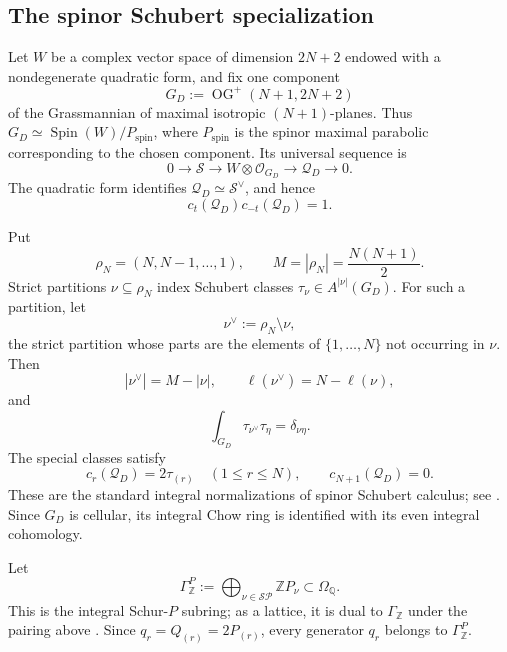 \documentclass[11pt,a4paper,oneside]{amsart}
\numberwithin{equation}{section}
\theoremstyle{definition}
\theoremstyle{remark}
\begin{document}
\subsection{The spinor Schubert specialization}
\label{appA:spinor-specialization}

Let $W$ be a complex vector space of dimension $2N+2$ endowed with a
nondegenerate quadratic form, and fix one component
\[
  G_D:=\operatorname{OG}^{+}(N+1,2N+2)
\]
of the Grassmannian of maximal isotropic $(N+1)$-planes.  Thus
$G_D\simeq \operatorname{Spin}(W)/P_{\mathrm{spin}}$, where $P_{\mathrm{spin}}$ is the
spinor maximal parabolic corresponding to the chosen component.  Its universal sequence
is
\begin{equation}
\label{appA:eq:universal-D}
  0\longrightarrow\mathcal S\longrightarrow
  W\otimes\mathcal O_{G_D}\longrightarrow\mathcal Q_D\longrightarrow0.
\end{equation}
The quadratic form identifies $\mathcal Q_D\simeq\mathcal S^\vee$, and hence
\begin{equation}
\label{appA:eq:Chern-relation-D}
  c_t(\mathcal Q_D)c_{-t}(\mathcal Q_D)=1.
\end{equation}

Put
\[
  \rho_N=(N,N-1,\ldots,1),
  \qquad
  M=|\rho_N|=\frac{N(N+1)}2.
\]
Strict partitions $\nu\subseteq\rho_N$ index Schubert classes
$\tau_\nu\in A^{|\nu|}(G_D)$.  For such a partition, let
\[
  \nu^\vee:=\rho_N\setminus\nu,
\]
the strict partition whose parts are the elements of $\{1,\ldots,N\}$ not
occurring in $\nu$.  Then
\[
  |\nu^\vee|=M-|\nu|,
  \qquad
  \ell(\nu^\vee)=N-\ell(\nu),
\]
and
\begin{equation}
\label{appA:eq:D-pairing}
  \int_{G_D}\tau_{\nu^\vee}\tau_\eta=\delta_{\nu\eta}.
\end{equation}
The special classes satisfy
\begin{equation}
\label{appA:eq:D-special-classes}
  c_r(\mathcal Q_D)=2\tau_{(r)}\quad(1\le r\le N),
  \qquad
  c_{N+1}(\mathcal Q_D)=0.
\end{equation}
These are the standard integral normalizations of spinor Schubert calculus;
see \cite{KT04,PR97}.  Since $G_D$ is cellular, its integral Chow ring
is identified with its even integral cohomology.

Let
\[
  \Gamma^P_{\mathbb Z}
  :=\bigoplus_{\nu\in\mathcal{SP}}\mathbb ZP_\nu
  \subset\Omega_{\mathbb Q}.
\]
This is the integral Schur-$P$ subring; as a lattice, it is dual to
$\Gamma_{\mathbb Z}$ under the pairing above
\cite[Chapter~III, Section~8]{Macdonald}.  Since
$q_r=Q_{(r)}=2P_{(r)}$, every generator $q_r$ belongs to
$\Gamma^P_{\mathbb Z}$.
\end{document}
